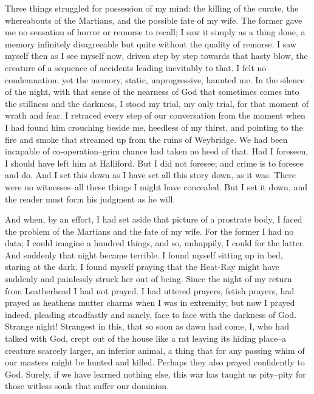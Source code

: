 Three things struggled for possession of my mind: the killing of
the curate, the whereabouts of the Martians, and the possible fate
of my wife. The former gave me no sensation of horror or remorse to
recall; I saw it simply as a thing done, a memory infinitely
disagreeable but quite without the quality of remorse. I saw myself
then as I see myself now, driven step by step towards that hasty
blow, the creature of a sequence of accidents leading inevitably to
that. I felt no condemnation; yet the memory, static,
unprogressive, haunted me. In the silence of the night, with that
sense of the nearness of God that sometimes comes into the
stillness and the darkness, I stood my trial, my only trial, for
that moment of wrath and fear. I retraced every step of our
conversation from the moment when I had found him crouching beside
me, heedless of my thirst, and pointing to the fire and smoke that
streamed up from the ruins of Weybridge. We had been incapable of
co-operation--grim chance had taken no heed of that. Had I
foreseen, I should have left him at Halliford. But I did not
foresee; and crime is to foresee and do. And I set this down as I
have set all this story down, as it was. There were no
witnesses--all these things I might have concealed. But I set it
down, and the reader must form his judgment as he will.

And when, by an effort, I had set aside that picture of a prostrate
body, I faced the problem of the Martians and the fate of my wife.
For the former I had no data; I could imagine a hundred things, and
so, unhappily, I could for the latter. And suddenly that night
became terrible. I found myself sitting up in bed, staring at the
dark. I found myself praying that the Heat-Ray might have suddenly
and painlessly struck her out of being. Since the night of my
return from Leatherhead I had not prayed. I had uttered prayers,
fetish prayers, had prayed as heathens mutter charms when I was in
extremity; but now I prayed indeed, pleading steadfastly and
sanely, face to face with the darkness of God. Strange night!
Strangest in this, that so soon as dawn had come, I, who had talked
with God, crept out of the house like a rat leaving its hiding
place--a creature scarcely larger, an inferior animal, a thing that
for any passing whim of our masters might be hunted and killed.
Perhaps they also prayed confidently to God. Surely, if we have
learned nothing else, this war has taught us pity--pity for those
witless souls that suffer our dominion.

